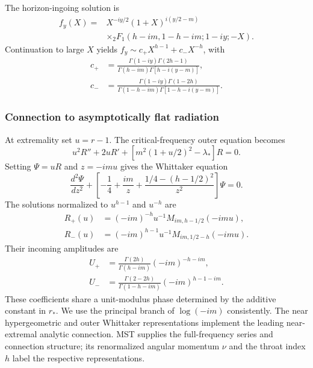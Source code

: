The horizon-ingoing solution is
\begin{align}
f_y(X)={}&X^{-iy/2}(1+X)^{i(y/2-m)}\nonumber\\
&\times{}_2F_1(h-im,1-h-im;1-iy;-X).
\label{eq:principal-near-solution}
\end{align}
Continuation to large $X$ yields $f_y\sim c_+X^{h-1}+c_-X^{-h}$, with
\begin{align}
c_+&=\frac{\Gamma(1-iy)\Gamma(2h-1)}
{\Gamma(h-im)\Gamma[h-i(y-m)]},\nonumber\\
c_-&=\frac{\Gamma(1-iy)\Gamma(1-2h)}
{\Gamma(1-h-im)\Gamma[1-h-i(y-m)]}.
\label{eq:principal-near-connection}
\end{align}

\subsubsection{Connection to asymptotically flat radiation}

At extremality set $u=r-1$.  The critical-frequency outer equation becomes
\begin{equation}
u^2R''+2uR'+[m^2(1+u/2)^2-\lambda_*]R=0.
\label{eq:principal-outer-ode}
\end{equation}
Setting $\Psi=uR$ and $z=-imu$ gives the Whittaker equation
\begin{equation}
\frac{d^2\Psi}{dz^2}
+\left[-\frac14+\frac{im}{z}+
\frac{1/4-(h-1/2)^2}{z^2}\right]\Psi=0.
\end{equation}
The solutions normalized to $u^{h-1}$ and $u^{-h}$ are
\begin{align}
R_+(u)&=(-im)^{-h}u^{-1}M_{im,h-1/2}(-imu),\nonumber\\
R_-(u)&=(-im)^{h-1}u^{-1}M_{im,1/2-h}(-imu).
\end{align}
Their incoming amplitudes are
\begin{align}
U_+&=\frac{\Gamma(2h)}{\Gamma(h-im)}(-im)^{-h-im},\nonumber\\
U_-&=\frac{\Gamma(2-2h)}{\Gamma(1-h-im)}(-im)^{h-1-im}.
\label{eq:principal-outer-connection}
\end{align}
These coefficients share a unit-modulus phase determined by the additive
constant in $r_*$.  We use the principal branch of $\log(-im)$ consistently.
The near hypergeometric and outer Whittaker representations implement the
leading near-extremal analytic connection.  MST supplies the full-frequency
series and connection structure\cite{MST1996}; its renormalized angular
momentum $\nu$ and the throat index $h$ label the respective representations.

